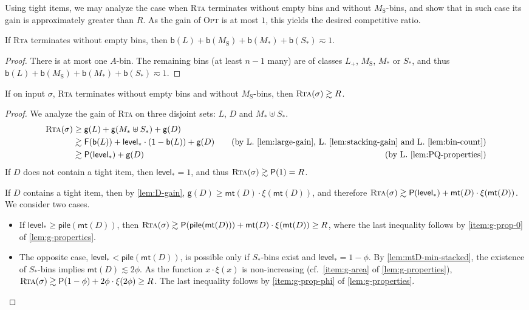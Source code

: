 \documentclass[a4paper,USenglish,cleveref]{lipics-v2019}
\newcommand{\R}{\ensuremath{R}}
\newcommand{\LG}{\ensuremath{L}\xspace}
\newcommand{\M}{\ensuremath{M_\mathrm{S}}\xspace}
\newcommand{\A}{\ensuremath{A}\xspace}
\newcommand{\ST}{\ensuremath{S_*}\xspace}
\newcommand{\MT}{\ensuremath{M_*}\xspace}
\newcommand{\LT}{\ensuremath{L_+}\xspace}
\newcommand{\D}{\ensuremath{D}\xspace}
\newcommand{\smallBoundary}{\ensuremath{\phi}}
\newcommand{\g}{\ensuremath{\xi}}
\newcommand{\fintegral}{\textsf{F}}
\newcommand{\cutintegral}{\textsf{P}}
\newcommand{\B}{\textsf{b}}
\newcommand{\gain}{\textsf{g}}
\newcommand{\stack}{\textsf{pile}}
\newcommand{\level}{\textsf{level}_*}
\newcommand{\mt}{\textsf{mt}(\D)}
\newcommand{\ALG}{\textsc{Rta}\xspace}
\newcommand{\OPT}{\textsc{Opt}\xspace}
\begin{document}
Using tight items, we may analyze the case when \ALG terminates without empty
bins and without $\M$-bins, and show that in such case its gain is approximately
greater than $\R$. As the gain of \OPT is at most $1$, this yields the desired
competitive ratio. 

\begin{lemma}
\label{lem:bin-count}
If \ALG terminates without empty bins, then $\B(\LG) + \B(\M) + \B(\MT) + \B(\ST) \eqsim 1$. 
\end{lemma}

\begin{proof}
There is at most one \A-bin.
The remaining bins (at least $n-1$ many) are of classes \LT, \M, $\MT$ or \ST,
and thus $\B(\LG) + \B(\M) + \B(\MT) + \B(\ST) \eqsim 1$. 
\end{proof}

\begin{lemma}
\label{lem:no-m-bin}
If on input $\sigma$, \ALG terminates without empty bins and without \M-bins, then $\ALG(\sigma) \gtrsim \R$.
\end{lemma}

\begin{proof}
We analyze the gain of \ALG on three disjoint sets: $\LG$, $D$ and $\MT \uplus \ST$.
\begin{align*}
  \ALG(\sigma)
  & \geq \gain(\LG) + \gain(\MT \uplus \ST) + \gain(\D) \\
  & \gtrsim \fintegral(\B(\LG)) + \level \cdot (1-\B(\LG)) + \gain(\D)
    &&& \text{(by L.~\ref{lem:large-gain}, L.~\ref{lem:stacking-gain}
      and L.~\ref{lem:bin-count})} \\
  & \gtrsim \cutintegral(\level) + \gain(\D) 
  &&& \text{(by L.~\ref{lem:PQ-properties})}
  \end{align*}
If $\D$ does not contain a tight item, then $\level = 1$,
and thus $\ALG(\sigma) \gtrsim \cutintegral(1) = \R$.

If $\D$ contains a tight item, then 
by \cref{lem:D-gain}, $\gain(\D) \geq \mt \cdot \g(\mt)$, and therefore
$\ALG(\sigma) \gtrsim \cutintegral(\level) + \mt \cdot \g(\mt)$.
We consider two cases.
\begin{itemize}
\item If $\level \geq \stack(\mt)$, 
then $\ALG(\sigma) \gtrsim \cutintegral(\stack(\mt)) + \mt \cdot \g(\mt) \geq \R$,
where the last inequality follows by \cref{item:g-prop-0} of \cref{lem:g-properties}.

\item 
The opposite case, $\level < \stack(\mt)$, is possible only if $\ST$-bins exist
and $\level = 1-\smallBoundary$. By \cref{lem:mtD-min-stacked}, the existence of
$\ST$-bins implies $\mt \lesssim 2 \smallBoundary$. As the function $x \cdot
\g(x)$ is non-increasing (cf.~\cref{item:g-area} of \cref{lem:g-properties}),
$\ALG(\sigma) \gtrsim \cutintegral(1-\smallBoundary) + 2 \smallBoundary \cdot
\g(2 \smallBoundary) \geq R$. The last inequality follows by
\cref{item:g-prop-phi} of \cref{lem:g-properties}.
\qedhere
\end{itemize}
\end{proof}
\end{document}
